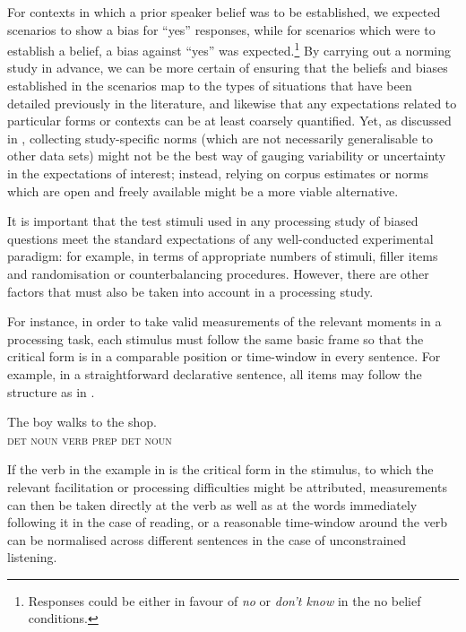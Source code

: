 \documentclass[output=paper,colorlinks,citecolor=brown]{langscibook}
\begin{document}
For contexts in which a prior speaker belief was to be established, we expected scenarios to show a bias for ``yes'' responses, while for scenarios which were to establish a belief, a bias against ``yes'' was expected.\footnote{Responses could be either in favour of \textit{no} or \textit{don't know} in the no belief conditions.} By carrying out a norming study in advance, we can be more certain of ensuring that the beliefs and biases established in the scenarios map to the types of situations that have been detailed previously in the literature, and likewise that any expectations related to particular forms or contexts can be at least coarsely quantified. Yet, as discussed in \citet{Lemke2021}, collecting study-specific norms (which are not necessarily generalisable to other data sets) might not be the best way of gauging variability or uncertainty in the expectations of interest; instead, relying on corpus estimates or norms which are open and freely available might be a more viable alternative.


It is important that the test stimuli used in any processing study of biased questions meet the standard expectations of any well-conducted experimental paradigm: for example, in terms of appropriate numbers of stimuli, filler items and randomisation or counterbalancing procedures. However, there are other factors that must also be taken into account in a processing study.

For instance, in order to take valid measurements of the relevant moments in a processing task, each stimulus must follow the same basic frame so that the critical form is in a comparable position or time-window in every sentence. For example, in a straightforward declarative sentence, all items may follow the structure as in .

\begin{exe}
\ex \label{declcrit} \gll The boy walks to the shop.\\
\textsc{det} \textsc{noun} \textsc{verb} \textsc{prep} \textsc{det} \textsc{noun}\\
\end{exe}

If the verb in the example in  is the critical form in the stimulus, to which the relevant facilitation or processing difficulties might be attributed, measurements can then be taken directly at the verb as well as at the words immediately following it in the case of reading, or a reasonable time-window around the verb can be normalised across different sentences in the case of unconstrained listening.
\end{document}
